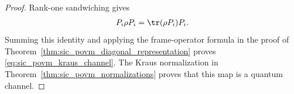 \begin{proof}\leanok
    Rank-one sandwiching gives
    \begin{align}
        P_i\rho P_i=\tr(\rho P_i)P_i.
    \end{align}
    Summing this identity and applying the frame-operator formula in the proof
    of Theorem~\ref{thm:sic_povm_diagonal_representation} proves
    \eqref{eq:sic_povm_kraus_channel}. The Kraus normalization in
    Theorem~\ref{thm:sic_povm_normalizations} proves that this map is a quantum
    channel.
\end{proof}

